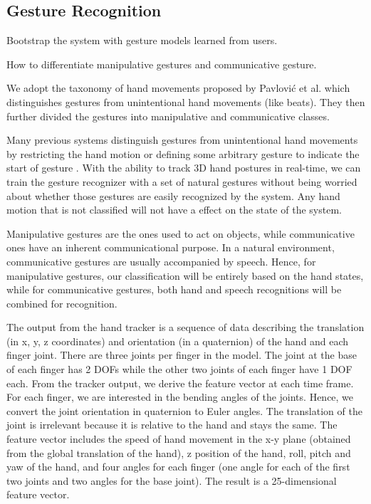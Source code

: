 \subsection{Gesture Recognition}
Bootstrap the system with gesture models learned from users.

How to differentiate manipulative gestures and communicative gesture.

We adopt the taxonomy of hand movements proposed by Pavlovi\'{c} et al. \cite{Pavlovic97} which distinguishes gestures from unintentional hand movements (like beats). They then further divided the gestures into manipulative and communicative classes. 

Many previous systems distinguish gestures from unintentional hand movements by restricting the hand motion or defining some arbitrary gesture to indicate the start of gesture \cite{Shin04}. With the ability to track 3D hand postures in real-time, we can train the gesture recognizer with a set of natural gestures without being worried about whether those gestures are easily recognized by the system. Any hand motion that is not classified will not have a effect on the state of the system.

Manipulative gestures are the ones used to act on objects, while communicative ones have an inherent communicational purpose\cite{Pavlovic97}. In a natural environment, communicative gestures are usually accompanied by speech. Hence, for manipulative gestures, our classification will be entirely based on the hand states, while for communicative gestures, both hand and speech recognitions will be combined for recognition. 

The output from the hand tracker is a sequence of data describing the translation (in x, y, z coordinates) and orientation (in a quaternion) of the hand and each finger joint. There are three joints per finger in the model. The joint at the base of each finger has 2 DOFs while the other two joints of each finger have 1 DOF each. From the tracker output, we derive the feature vector at each time frame. For each finger, we are interested in the bending angles of the joints. Hence, we convert the joint orientation in quaternion to Euler angles. The translation of the joint is irrelevant because it is relative to the hand and stays the same. The feature vector includes the speed of hand movement in the x-y plane (obtained from the global translation of the hand), z position of the hand, roll, pitch and yaw of the hand, and four angles for each finger (one angle for each of the first two joints and two angles for the base joint). The result is a 25-dimensional feature vector.

